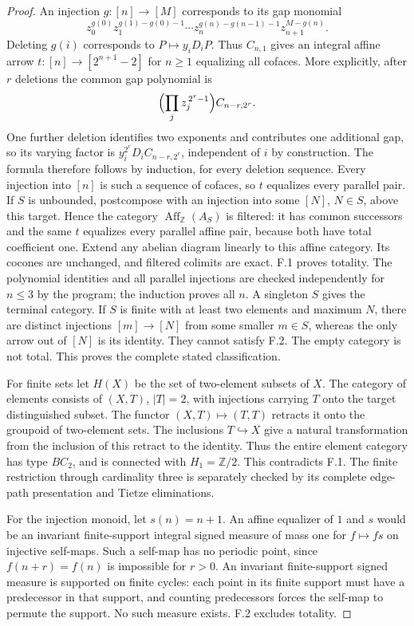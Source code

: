 \begin{proof}
An injection $g:[n]\to[M]$ corresponds to its gap monomial
\[
 z_0^{g(0)}z_1^{g(1)-g(0)-1}\cdots
 z_n^{g(n)-g(n-1)-1}z_{n+1}^{M-g(n)}.
\]
Deleting $g(i)$ corresponds to $P\mapsto y_iD_iP$. Thus $C_{n,1}$ gives an integral affine arrow $t:[n]\to[2^{n+1}-2]$ for $n\geq1$ equalizing all cofaces. More explicitly, after $r$ deletions the common gap polynomial is
\[
 \Bigl(\prod_j z_j^{\,2^r-1}\Bigr)C_{n-r,2^r}.
\]
One further deletion identifies two exponents and contributes one additional gap, so its varying factor is $y_i^{2^r}D_iC_{n-r,2^r}$, independent of $i$ by construction. The formula therefore follows by induction, for every deletion sequence. Every injection into $[n]$ is such a sequence of cofaces, so $t$ equalizes every parallel pair. If $S$ is unbounded, postcompose with an injection into some $[N]$, $N\in S$, above this target. Hence the category $\operatorname{Aff}_{\mathbb Z}(A_S)$ is filtered: it has common successors and the same $t$ equalizes every parallel affine pair, because both have total coefficient one. Extend any abelian diagram linearly to this affine category. Its cocones are unchanged, and filtered colimits are exact. F.1 proves totality. The polynomial identities and all parallel injections are checked independently for $n\leq3$ by the program; the induction proves all $n$.
A singleton $S$ gives the terminal category. If $S$ is finite with at least two elements and maximum $N$, there are distinct injections $[m]\to[N]$ from some smaller $m\in S$, whereas the only arrow out of $[N]$ is its identity. They cannot satisfy F.2. The empty category is not total. This proves the complete stated classification.

For finite sets let $H(X)$ be the set of two-element subsets of $X$. The category of elements consists of $(X,T)$, $|T|=2$, with injections carrying $T$ onto the target distinguished subset. The functor $(X,T)\mapsto(T,T)$ retracts it onto the groupoid of two-element sets. The inclusions $T\hookrightarrow X$ give a natural transformation from the inclusion of this retract to the identity. Thus the entire element category has type $BC_2$, and is connected with $H_1=\mathbb Z/2$. This contradicts F.1. The finite restriction through cardinality three is separately checked by its complete edge-path presentation and Tietze eliminations.

For the injection monoid, let $s(n)=n+1$. An affine equalizer of $1$ and $s$ would be an invariant finite-support integral signed measure of mass one for $f\mapsto f s$ on injective self-maps. Such a self-map has no periodic point, since $f(n+r)=f(n)$ is impossible for $r>0$. An invariant finite-support signed measure is supported on finite cycles: each point in its finite support must have a predecessor in that support, and counting predecessors forces the self-map to permute the support. No such measure exists. F.2 excludes totality.


\end{proof}
